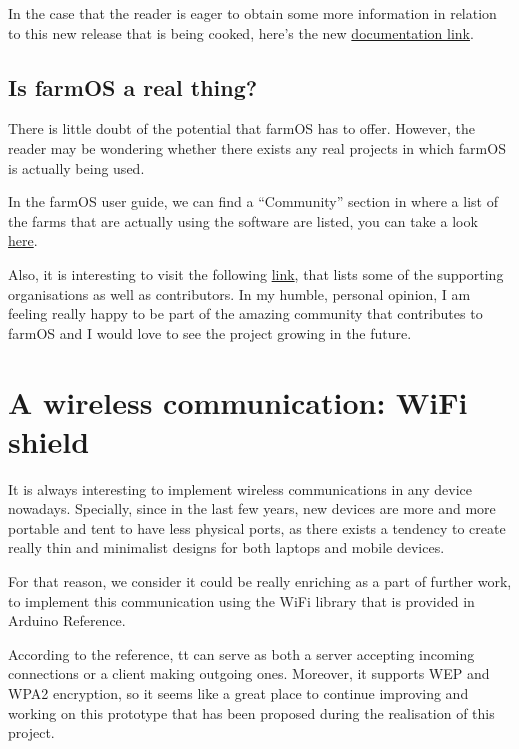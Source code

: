 In the case that the reader is eager to obtain some more information in relation to this new release that is being cooked, here's the new \href{https://docs.farmos.org/model/}{documentation link}.

\subsection{Is farmOS a real thing?}
There is little doubt of the potential that farmOS has to offer. However, the reader may be wondering whether there exists any real projects in which farmOS is actually being used.

In the farmOS user guide, we can find a ``Community'' section in where a list of the farms that are actually using the software are listed, you can take a look \href{https://farmos.org/community/farms/}{here}.

Also, it is interesting to visit the following \href{https://farmos.org/community/supporters/}{link}, that lists some of the supporting organisations as well as contributors. In my humble, personal opinion, I am feeling really happy to be part of the amazing community that contributes to farmOS and I would love to see the project growing in the future.  

\vspace{7mm}
\section{A wireless communication: WiFi shield}
It is always interesting to implement wireless communications in any device nowadays. Specially, since in the last few years, new devices are more and more portable and tent to have less physical ports, as there exists a tendency to create really thin and minimalist designs for both laptops and mobile devices.

For that reason, we consider it could be really enriching as a part of further work, to implement this communication using the WiFi library\cite{wifi} that is provided in Arduino Reference.

According to the reference, tt can serve as both a server accepting incoming connections or a client making outgoing ones. Moreover, it supports WEP and WPA2 encryption, so it seems like a great place to continue improving and working on this prototype that has been proposed during the realisation of this project.